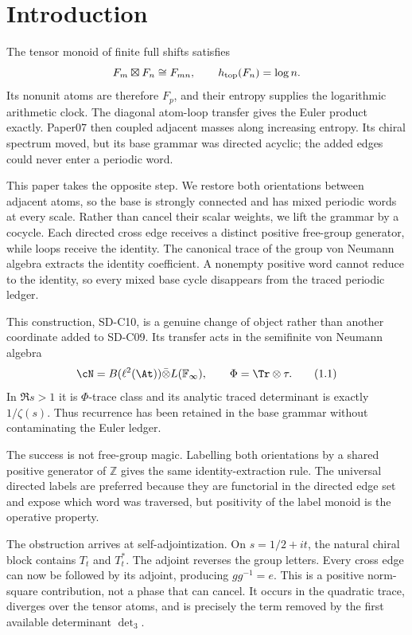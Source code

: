 \section{Introduction}
\label{sec:introduction}

The tensor monoid of finite full shifts satisfies
\[
 F_m\boxtimes F_n\cong F_{mn},\qquad h_{\rm top}(F_n)=\log n.
\]
Its nonunit atoms are therefore $F_p$, and their entropy supplies the
logarithmic arithmetic clock.  The diagonal atom-loop transfer gives the
Euler product exactly.  Paper07 then coupled adjacent masses along increasing
entropy.  Its chiral spectrum moved, but its base grammar was directed
acyclic; the added edges could never enter a periodic word.

This paper takes the opposite step.  We restore both orientations between
adjacent atoms, so the base is strongly connected and has mixed periodic
words at every scale.  Rather than cancel their scalar weights, we lift the
grammar by a cocycle.  Each directed cross edge receives a distinct positive
free-group generator, while loops receive the identity.  The canonical trace
of the group von Neumann algebra extracts the identity coefficient.  A
nonempty positive word cannot reduce to the identity, so every mixed base
cycle disappears from the traced periodic ledger.



This construction, SD-C10, is a genuine change of object rather than another
coordinate added to SD-C09.  Its transfer acts in the semifinite von Neumann
algebra
\[
 \cN=B(\ell^2(\At))\bar\otimes L(\mathbb F_\infty),
 \qquad \Phi=\Tr\otimes\tau.                 \tag{1.1}
\]
In $\Re s>1$ it is $\Phi$-trace class and its analytic traced determinant is
exactly $1/\zeta(s)$.  Thus recurrence has been retained in the base grammar
without contaminating the Euler ledger.

The success is not free-group magic.  Labelling both orientations by a
shared positive generator of $\mathbb Z$ gives the same identity-extraction
rule.  The universal directed labels are preferred because they are
functorial in the directed edge set and expose which word was traversed, but
positivity of the label monoid is the operative property.

The obstruction arrives at self-adjointization.  On $s=1/2+it$, the natural
chiral block contains $T_t$ and $T_t^*$.  The adjoint reverses the group
letters.  Every cross edge can now be followed by its adjoint, producing
$gg^{-1}=e$.  This is a positive norm-square contribution, not a phase that
can cancel.  It occurs in the quadratic trace, diverges over the tensor
atoms, and is precisely the term removed by the first available determinant
$\det_3$.


